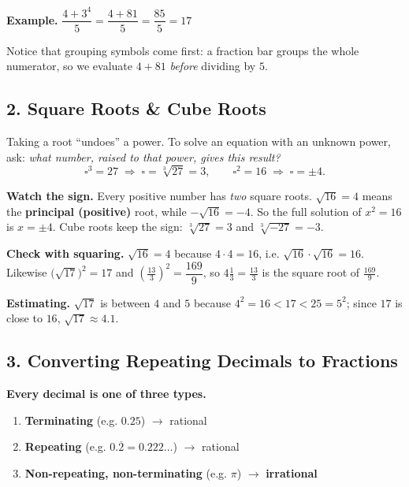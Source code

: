 \documentclass[11pt]{article}
\newcommand{\rep}[1]{\overline{#1}}
\begin{document}
\begin{examplebox}
\textbf{Example.}\quad
$\dfrac{4+3^{4}}{5}=\dfrac{4+81}{5}=\dfrac{85}{5}=\boxed{17}$
\end{examplebox}

Notice that grouping symbols come first: a fraction bar groups the whole
numerator, so we evaluate $4+81$ \emph{before} dividing by $5$.

\subsection*{2.\; Square Roots \& Cube Roots}

Taking a root ``undoes'' a power. To solve an equation with an unknown power,
ask: \emph{what number, raised to that power, gives this result?}
\[
\square^{3}=27 \;\Longrightarrow\; \square=\sqrt[3]{27}=3,
\qquad
\square^{2}=16 \;\Longrightarrow\; \square=\pm 4.
\]

\begin{conceptbox}
\textbf{\color{fangblue}Watch the sign.}
Every positive number has \emph{two} square roots.
$\sqrt{16}=4$ means the \textbf{principal (positive)} root, while
$-\sqrt{16}=-4$. So the full solution of $x^{2}=16$ is $x=\pm 4$.
Cube roots keep the sign: $\sqrt[3]{27}=3$ and $\sqrt[3]{-27}=-3$.
\end{conceptbox}

\begin{examplebox}
\textbf{Check with squaring.}\quad
$\sqrt{16}=4$ because $4\cdot 4 =16$, i.e. $\sqrt{16}\cdot\sqrt{16}=16$.
Likewise $\bigl(\sqrt{17}\bigr)^{2}=17$ and
$\left(\tfrac{13}{3}\right)^{2}=\dfrac{169}{9}$, so
$4\tfrac{1}{3}=\tfrac{13}{3}$ is the square root of $\tfrac{169}{9}$.
\end{examplebox}

\textbf{Estimating.} $\sqrt{17}$ is between $4$ and $5$ because
$4^{2}=16 < 17 < 25 = 5^{2}$; since $17$ is close to $16$, $\sqrt{17}\approx 4.1$.

\subsection*{3.\; Converting Repeating Decimals to Fractions}

\begin{conceptbox}
\textbf{\color{fangblue}Every decimal is one of three types.}
\begin{enumerate}[label=\textbf{(\arabic*)},leftmargin=2.2em,itemsep=1pt]
  \item \textbf{Terminating} (e.g. $0.25$) $\rightarrow$ rational
  \item \textbf{Repeating} (e.g. $0.\rep{2}=0.222\ldots$) $\rightarrow$ rational
  \item \textbf{Non-repeating, non-terminating} (e.g. $\pi$) $\rightarrow$ \textbf{irrational}
\end{enumerate}
\end{conceptbox}
\end{document}
